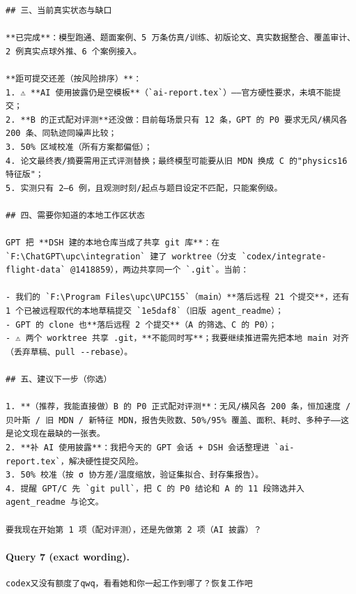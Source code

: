 \documentclass[UTF8,10pt]{ctexart}
\begin{document}
\begin{Verbatim}[breaklines=true,breakanywhere=true,fontsize=\scriptsize,frame=single,framesep=2pt]
## 三、当前真实状态与缺口

**已完成**：模型跑通、题面案例、5 万条仿真/训练、初版论文、真实数据整合、覆盖审计、2 例真实点球外推、6 个案例接入。

**距可提交还差（按风险排序）**：
1. ⚠ **AI 使用披露仍是空模板**（`ai-report.tex`）——官方硬性要求，未填不能提交；
2. **B 的正式配对评测**还没做：目前每场景只有 12 条，GPT 的 P0 要求无风/横风各 200 条、同轨迹同噪声比较；
3. 50% 区域校准（所有方案都偏低）；
4. 论文最终表/摘要需用正式评测替换；最终模型可能要从旧 MDN 换成 C 的"physics16 特征版"；
5. 实测只有 2–6 例，且观测时刻/起点与题目设定不匹配，只能案例级。

## 四、需要你知道的本地工作区状态

GPT 把 **DSH 建的本地仓库当成了共享 git 库**：在 `F:\ChatGPT\upc\integration` 建了 worktree（分支 `codex/integrate-flight-data` @1418859），两边共享同一个 `.git`。当前：

- 我们的 `F:\Program Files\upc\UPC155`（main）**落后远程 21 个提交**，还有 1 个已被远程取代的本地草稿提交 `1e5daf8`（旧版 agent_readme）；
- GPT 的 clone 也**落后远程 2 个提交**（A 的筛选、C 的 P0）；
- ⚠ 两个 worktree 共享 .git，**不能同时写**；我要继续推进需先把本地 main 对齐（丢弃草稿、pull --rebase）。

## 五、建议下一步（你选）

1. **（推荐，我能直接做）B 的 P0 正式配对评测**：无风/横风各 200 条，恒加速度 / 贝叶斯 / 旧 MDN / 新特征 MDN，报告失败数、50%/95% 覆盖、面积、耗时、多种子——这是论文现在最缺的一张表。
2. **补 AI 使用披露**：我把今天的 GPT 会话 + DSH 会话整理进 `ai-report.tex`，解决硬性提交风险。
3. 50% 校准（按 σ 协方差/温度缩放，验证集拟合、封存集报告）。
4. 提醒 GPT/C 先 `git pull`，把 C 的 P0 结论和 A 的 11 段筛选并入 agent_readme 与论文。

要我现在开始第 1 项（配对评测），还是先做第 2 项（AI 披露）？
\end{Verbatim}

\paragraph{Query 7 (exact wording).}
\begin{Verbatim}[breaklines=true,breakanywhere=true,fontsize=\scriptsize,frame=single,framesep=2pt]
codex又没有额度了qwq，看看她和你一起工作到哪了？恢复工作吧
\end{Verbatim}
\end{document}
